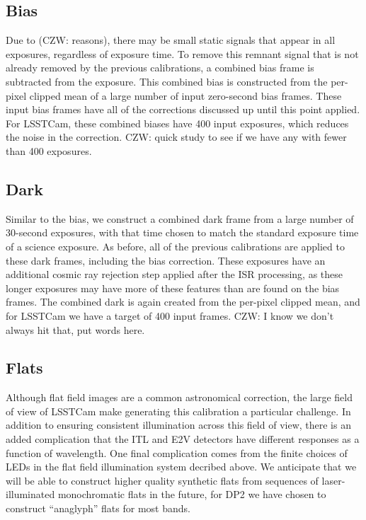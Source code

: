 

\subsection{Bias} \label{sec:processing:calibration:bias}

Due to (CZW: reasons), there may be small static signals that appear in all exposures, regardless of exposure time.
To remove this remnant signal that is not already removed by the previous calibrations, a combined bias frame is subtracted from the exposure.
This combined bias is constructed from the per-pixel clipped mean of a large number of input zero-second bias frames.
These input bias frames have all of the corrections discussed up until this point applied.
For LSSTCam, these combined biases have 400 input exposures, which reduces the noise in the correction.
CZW: quick study to see if we have any with fewer than 400 exposures.

\subsection{Dark} \label{sec:processing:calibration:dark}

Similar to the bias, we construct a combined dark frame from a large number of 30-second exposures, with that time chosen to match the standard exposure time of a science exposure.
As before, all of the previous calibrations are applied to these dark frames, including the bias correction.
These exposures have an additional cosmic ray rejection step applied after the ISR processing, as these longer exposures may have more of these features than are found on the bias frames.
The combined dark is again created from the per-pixel clipped mean, and for LSSTCam we have a target of 400 input frames.
CZW: I know we don't always hit that, put words here.

\subsection{Flats} \label{sec:processing:calibration:flats}

Although flat field images are a common astronomical correction, the large field of view of LSSTCam make generating this calibration a particular challenge.
In addition to ensuring consistent illumination across this field of view, there is an added complication that the ITL and E2V detectors have different responses as a function of wavelength.
One final complication comes from the finite choices of LEDs in the flat field illumination system decribed above.
We anticipate that we will be able to construct higher quality synthetic flats from sequences of laser-illuminated monochromatic flats in the future, for DP2 we have chosen to construct ``anaglyph'' flats for most bands.

